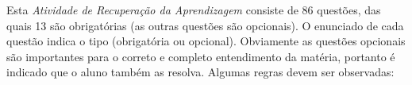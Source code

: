 \documentclass[pdftex, brazil, 12pt, oneside, addpoints]{exam}
\begin{document}
\newpage



\vspace{0.5cm}



Esta \emph{Atividade de Recuperação da Aprendizagem} consiste de
86 questões, das quais 13 são obrigatórias (as outras questões
são opcionais). O enunciado de cada questão indica o tipo (obrigatória ou
opcional). Obviamente as questões opcionais são importantes para o
correto e completo entendimento da matéria, portanto é indicado que o
aluno também as resolva.
Algumas regras devem ser observadas:

\vspace{0.5cm}
\end{document}
